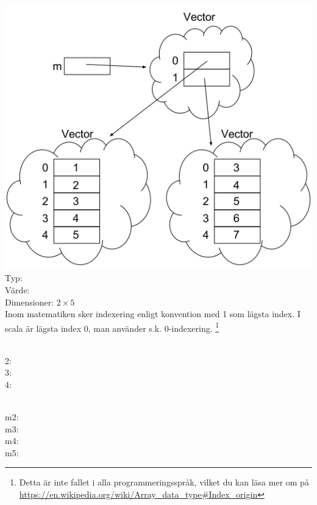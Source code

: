 

\ExerciseSolution{\ExeWeekEIGHT}

\BasicTasks %

\Task

\Subtask  \includegraphics{../img/w09-solutions/1a} \\
Typ: \\
Värde:  \\
Dimensioner: $2 \times 5$\\
Inom matematiken sker indexering enligt konvention med 1 som lägsta index. I scala är lägsta index 0, man använder s.k. 0-indexering. \footnote{Detta är inte fallet i alla programmeringsspråk, vilket du kan läsa mer om på \url{https://en.wikipedia.org/wiki/Array\_data\_type\#Index\_origin}}

\Subtask \\
2: \\
3: \\
4: 

\Subtask \\
m2: \\
m3: \\
m4: \\
m5: 

